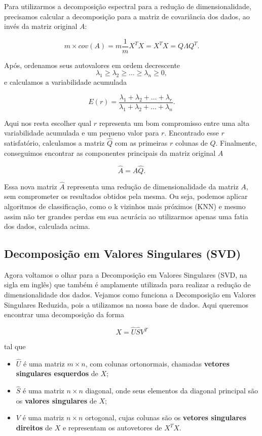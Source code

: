 \documentclass[a4paper, 12pt]{article}
\theoremstyle{definition}
\theoremstyle{remark}
\begin{document}
Para utilizarmos a decomposição espectral para a redução de dimensionalidade, precisamos calcular a decomposição para a matriz de covariância dos dados, ao invés da matriz original $A$:

$$m \times cov(A) = m \frac{1}{m}X^TX = X^TX = Q\Lambda Q^T.$$

Após, ordenamos seus autovalores em ordem decrescente $$\lambda_1 \geq \lambda_2 \geq \dots \geq \lambda_n \geq 0,$$ e calculamos a variabilidade acumulada

$$E(r) = \frac{\lambda_1 + \lambda_2 + \dots + \lambda_r}{\lambda_1 + \lambda_2 + \dots + \lambda_n}.$$

Aqui nos resta escolher qual $r$ representa um bom compromisso entre uma alta variabilidade acumulada e um pequeno valor para $r$. Encontrado esse $r$ satisfatório, calculamos a matriz $\hat{Q}$ com as primeiras $r$ colunas de $Q$. Finalmente, conseguimos encontrar as componentes principais da matriz original $A$

$$\hat{A} = A\hat{Q}.$$

Essa nova matriz $\hat{A}$ representa uma redução de dimensionalidade da matriz $A$, sem comprometer os resultados obtidos pela mesma. Ou seja, podemos aplicar algoritmos de classificação, como o k vizinhos mais próximos (KNN) e mesmo assim não ter grandes perdas em sua acurácia ao utilizarmos apenas uma fatia dos dados, calculada acima.

\subsection{Decomposição em Valores Singulares (SVD)}

Agora voltamos o olhar para a Decomposição em Valores Singulares (SVD, na sigla em inglês) que também é amplamente utilizada para realizar a redução de dimensionalidade dos dados. Vejamos como funciona a Decomposição em Valores Singulares Reduzida, pois a utilizamos na nossa base de dados. Aqui queremos encontrar uma decomposição da forma

$$X = \hat{U}\hat{S}V^T$$

tal que

\begin{itemize}
    \item $\hat{U}$ é uma matriz $m \times n$, com colunas ortonormais, chamadas \textbf{vetores singulares esquerdos} de $X$;
    \item $\hat{S}$ é uma matriz $n \times n$ diagonal, onde seus elementos da diagonal principal são os \textbf{valores singulares} de $X$;
    \item $V$ é uma matriz $n \times n$ ortogonal, cujas colunas são os \textbf{vetores singulares direitos} de $X$ e representam os autovetores de $X^TX$.
\end{itemize}
\end{document}
